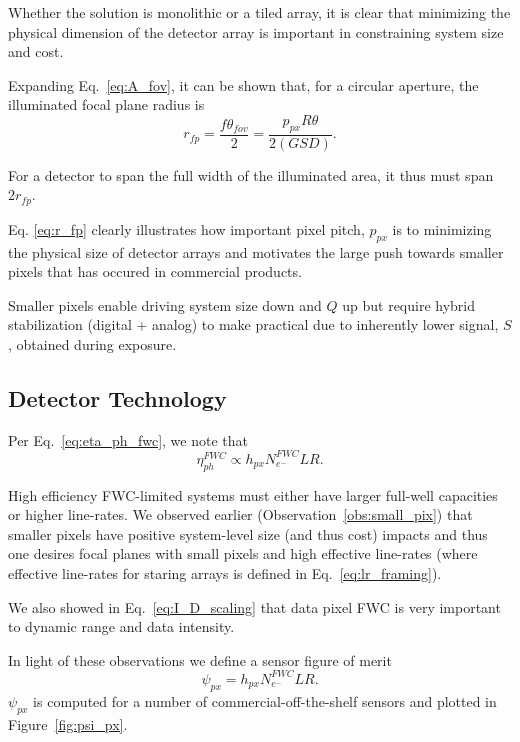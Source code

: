 \documentclass[10pt,journal]{IEEEtran}  %
\begin{document}
Whether the solution is monolithic or a tiled array, it is clear that minimizing the physical dimension of the detector array is important in constraining system size and cost.

Expanding Eq.~\eqref{eq:A_fov}, it can be shown that, for a circular aperture, the illuminated focal plane radius is
\begin{equation}
    \label{eq:r_fp}
    r_{fp} = \frac{f\theta_{fov}}{2} = \frac{p_{px}R\theta}{2 (GSD)}.
\end{equation}

For a detector to span the full width of the illuminated area, it thus must span $2 r_{fp}$. 

Eq. \eqref{eq:r_fp} clearly illustrates how important pixel pitch, $p_{px}$ is to minimizing the physical size of detector arrays and motivates the large push towards smaller pixels that has occured in commercial products.

\begin{observation}
\label{obs:small_pix}
Smaller pixels enable driving system size down and $Q$ up but require hybrid stabilization (digital + analog) to make practical due to inherently lower signal, $S$, obtained during exposure.
\end{observation}

\subsection{Detector Technology}
\label{sec:detector_tech}

Per Eq.~\eqref{eq:eta_ph_fwc}, we note that 
\begin{equation}
    \eta_{ph}^{FWC} \propto h_{px}N_{e^-}^{FWC}LR.
\end{equation}

High efficiency FWC-limited systems must either have larger full-well capacities or higher line-rates.  We observed earlier (Observation~\ref{obs:small_pix}) that smaller pixels have positive system-level size (and thus cost) impacts and thus one desires focal planes with small pixels and high effective line-rates (where effective line-rates for staring arrays is defined in Eq.~\eqref{eq:lr_framing}).

We also showed in Eq.~\eqref{eq:I_D_scaling} that data pixel FWC is very important to dynamic range and data intensity.

In light of these observations we define a sensor figure of merit
\begin{equation}
    \psi_{px} = h_{px}N_{e^-}^{FWC}LR%
    \label{eq:psi_px}.
\end{equation}
$\psi_{px}$ is computed for a number of commercial-off-the-shelf sensors and plotted in Figure~\ref{fig:psi_px}.
\end{document}
